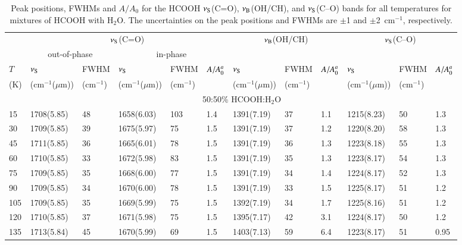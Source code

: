 \documentclass{aa}
\begin{document}
\begin{appendix}
\begin{table*}
\caption{Peak positions, FWHMs and $A/A_0$ for the HCOOH $\nu_{\rm
S}$(C=O), $\nu_{\rm B}$(OH/CH), and $\nu_{\rm S}$(C--O) bands for all
temperatures for mixtures of HCOOH with H$_2$O. The uncertainties on
the peak positions and FWHMs are $\pm$1 and $\pm$2~cm$^{-1}$,
respectively.}\label{pp_hcooh-h2o}
\begin{center}
\begin{tabular}{l|lllll|lll|lll}
\hline
\hline
             & \multicolumn{5}{c|}{$\nu_{\rm S}$(C=O)} & \multicolumn{3}{c|}{$\nu_{\rm B}$(OH/CH)} & \multicolumn{3}{c}{$\nu_{\rm S}$(C--O)}\\
             & \multicolumn{2}{c}{out-of-phase} &\multicolumn{3}{c|}{in-phase} & & & & & &\\
 $T$         & $\nu_{\rm S}$ & FWHM & $\nu_{\rm S}$ & FWHM & $A/A_{\rm 0}^a$& $\nu_{\rm S}$ & FWHM & $A/A_{\rm 0}^a$ & $\nu_{\rm S}$ & FWHM & $A/A_{\rm 0}^a$ \\
 (K)           & (cm$^{-1}$($\mu$m)) & (cm$^{-1}$) & (cm$^{-1}$($\mu$m)) & (cm$^{-1}$) & &(cm$^{-1}$($\mu$m)) & (cm$^{-1}$) & &(cm$^{-1}$($\mu$m)) & (cm$^{-1}$)& \\ 
\hline
 & \multicolumn{11}{c}{50:50\% HCOOH:H$_2$O}\\
\hline
15           & 1708(5.85) & 48 & 1658(6.03) & 103& 1.4 & 1391(7.19) & 37 & 1.1 & 1215(8.23) & 50 & 1.3\\ 
30           & 1709(5.85) & 39 & 1675(5.97) & 75 & 1.5 & 1391(7.19) & 37 & 1.2 & 1220(8.20) & 58 & 1.3\\ 
45           & 1711(5.85) & 36 & 1665(6.01) & 78 & 1.5 & 1391(7.19) & 36 & 1.3 & 1223(8.18) & 55 & 1.3\\ 
60           & 1710(5.85) & 33 & 1672(5.98) & 83 & 1.5 & 1391(7.19) & 35 & 1.3 & 1223(8.17) & 54 & 1.3\\ 
75           & 1709(5.85) & 35 & 1668(6.00) & 77 & 1.5 & 1391(7.19) & 34 & 1.4 & 1224(8.17) & 52 & 1.3\\ 
90           & 1709(5.85) & 34 & 1670(6.00) & 78 & 1.5 & 1391(7.19) & 33 & 1.5 & 1225(8.17) & 51 & 1.2\\ 
105          & 1709(5.85) & 35 & 1669(5.99) & 75 & 1.5 & 1392(7.19) & 34 & 1.7 & 1225(8.16) & 51 & 1.2\\ 
120          & 1710(5.85) & 37 & 1671(5.98) & 75 & 1.5 & 1395(7.17) & 42 & 3.1 & 1224(8.17) & 50 & 1.2\\ 
135          & 1713(5.84) & 45 & 1670(5.99) & 69 & 1.5 & 1403(7.13) & 59 & 6.4 & 1223(8.17) & 51 & 0.95\\

\end{tabular}
\end{center}
\end{table*}
\end{appendix}
\end{document}
